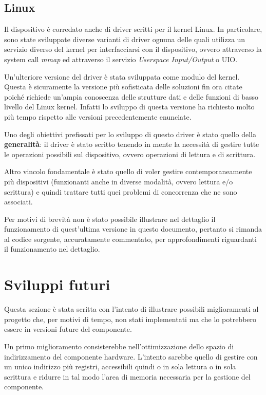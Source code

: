 \documentclass[12pt,a4paper,twoside,openany]{book}
\begin{document}
\subsection*{Linux}
Il dispositivo è corredato anche di driver scritti per il kernel Linux. In particolare, sono state sviluppate diverse varianti di driver ognuna delle quali utilizza un servizio diverso del kernel per interfacciarsi con il dispositivo, ovvero attraverso la system call \textit{mmap} ed attraverso  il servizio \textit{Userspace Input/Output} o UIO.

Un'ulteriore versione del driver è stata sviluppata come modulo del kernel. Questa è sicuramente la versione più sofisticata delle soluzioni fin ora citate poiché richiede un'ampia conoscenza delle strutture dati e delle funzioni di basso livello del Linux kernel. Infatti lo sviluppo di questa versione ha richiesto molto più tempo rispetto alle versioni precedentemente enunciate.

Uno degli obiettivi prefissati per lo sviluppo di questo driver è stato quello della \textbf{generalità}: il driver è stato scritto tenendo in mente la necessità di gestire tutte le operazioni possibili sul dispositivo, ovvero operazioni di lettura e di scrittura. 

Altro vincolo fondamentale è stato quello di voler gestire contemporaneamente più dispositivi (funzionanti anche in diverse modalità, ovvero lettura e/o scrittura) e quindi trattare tutti quei problemi di concorrenza che ne sono associati.

Per motivi di brevità non è stato possibile illustrare nel dettaglio il funzionamento di quest'ultima versione in questo documento, pertanto si rimanda al codice sorgente, accuratamente commentato, per approfondimenti riguardanti il funzionamento nel dettaglio.
\section*{Sviluppi futuri}
Questa sezione è stata scritta con l'intento di illustrare possibili miglioramenti al progetto che, per motivi di tempo, non stati implementati ma che lo potrebbero essere in versioni future del componente.

Un primo miglioramento consisterebbe nell'ottimizzazione dello spazio di indirizzamento del componente hardware. L'intento sarebbe quello di gestire con un unico indirizzo più registri, accessibili quindi o in sola lettura o in sola scrittura e ridurre in tal modo l'area di memoria necessaria per la gestione del componente.
\end{document}

